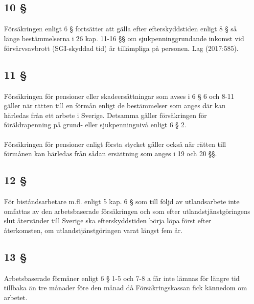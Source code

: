 \documentclass[a4paper,notitlepage,openany,10pt]{book}
\begin{document}
\subsection*{10 §}
\paragraph*{}
Försäkringen enligt 6 § fortsätter att gälla efter efterskyddstiden enligt 8 § så länge bestämmelserna i 26 kap. 11-16 §§ om sjukpenninggrundande inkomst vid förvärvsavbrott (SGI-skyddad tid) är tillämpliga på personen.
Lag (2017:585).
\subsection*{11 §}
\paragraph*{}
Försäkringen för pensioner eller skadeersättningar som avses i 6 § 6 och 8-11 gäller när rätten till en förmån enligt de bestämmelser som anges där kan härledas från ett arbete i Sverige. Detsamma gäller försäkringen för föräldrapenning på grund- eller sjukpenningnivå enligt 6 § 2.
\paragraph*{}
Försäkringen för pensioner enligt första stycket gäller också när rätten till förmånen kan härledas från sådan ersättning som anges i 19 och 20 §§.
\subsection*{12 §}
\paragraph*{}
För biståndsarbetare m.fl. enligt 5 kap. 6 § som till följd av utlandsarbete inte omfattas av den arbetsbaserade försäkringen och som efter utlandstjänstgöringens slut återvänder till Sverige ska efterskyddstiden börja löpa först efter återkomsten, om utlandstjänstgöringen varat längst fem år.
\subsection*{13 §}
\paragraph*{}
Arbetsbaserade förmåner enligt 6 § 1-5 och 7-8 a får inte lämnas för längre tid tillbaka än tre månader före den månad då Försäkringskassan fick kännedom om arbetet.
\end{document}

